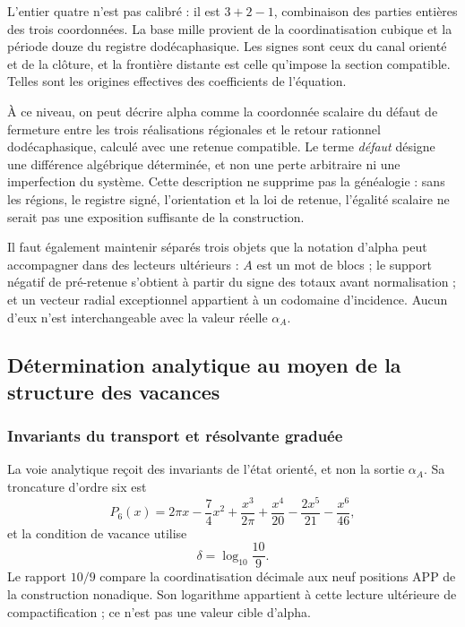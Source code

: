 L'entier quatre n'est pas calibré : il est
\(3+2-1\), combinaison des parties entières des trois coordonnées.
La base mille provient de la coordinatisation cubique et la période douze du registre dodécaphasique. Les
signes sont ceux du canal orienté et de la clôture, et la frontière distante est
celle qu'impose la section compatible. Telles sont les origines effectives des
coefficients de l'équation.

À ce niveau, on peut décrire alpha comme la coordonnée scalaire du défaut de fermeture entre les trois réalisations régionales et le retour rationnel dodécaphasique, calculé avec une retenue compatible. Le terme \emph{défaut} désigne une différence algébrique déterminée, et non une perte arbitraire ni une imperfection du système. Cette description ne supprime pas la généalogie : sans les régions, le registre signé, l'orientation et la loi de retenue, l'égalité scalaire ne serait pas une exposition suffisante de la construction.

Il faut également maintenir séparés trois objets que la notation d'alpha peut accompagner dans des lecteurs ultérieurs : \(A\) est un mot de blocs ; le support négatif de pré-retenue s'obtient à partir du signe des totaux avant normalisation ; et un vecteur radial exceptionnel appartient à un codomaine d'incidence. Aucun d'eux n'est interchangeable avec la valeur réelle \(\alpha_A\).






\subsection{Détermination analytique au moyen de la structure des vacances}
\subsubsection{Invariants du transport et résolvante graduée}
\label{subsec:alpha-via-b}

La voie analytique reçoit des invariants de l'état orienté, et non la sortie
\(\alpha_A\). Sa troncature d'ordre six est
\begin{equation}
 P_6(x)=2\pi x-\frac74x^2
 +\frac{x^3}{2\pi}
 +\frac{x^4}{20}-\frac{2x^5}{21}-\frac{x^6}{46},
 \label{eq:alpha-p6}
\end{equation}
et la condition de vacance utilise
\[
 \delta=\log_{10}\frac{10}{9}.
\]
Le rapport \(10/9\) compare la coordinatisation décimale aux neuf positions
APP de la construction nonadique. Son logarithme appartient à cette lecture
ultérieure de compactification ; ce n'est pas une valeur cible d'alpha.

